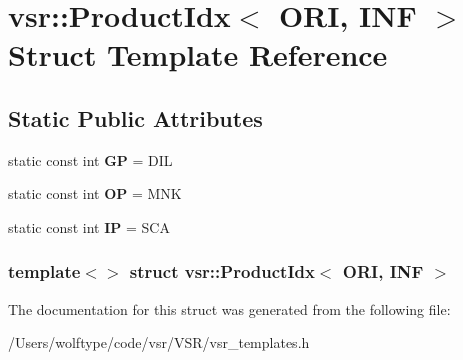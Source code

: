 \hypertarget{structvsr_1_1_product_idx_3_01_o_r_i_00_01_i_n_f_01_4}{\section{vsr\-:\-:Product\-Idx$<$ O\-R\-I, I\-N\-F $>$ Struct Template Reference}
\label{structvsr_1_1_product_idx_3_01_o_r_i_00_01_i_n_f_01_4}
}
\subsection*{Static Public Attributes}
\begin{DoxyCompactItemize}
\item 
\hypertarget{structvsr_1_1_product_idx_3_01_o_r_i_00_01_i_n_f_01_4_aac8eb9a04ba008186aa618f35bb2d6ff}{static const int {\bfseries G\-P} = D\-I\-L}\label{structvsr_1_1_product_idx_3_01_o_r_i_00_01_i_n_f_01_4_aac8eb9a04ba008186aa618f35bb2d6ff}

\item 
\hypertarget{structvsr_1_1_product_idx_3_01_o_r_i_00_01_i_n_f_01_4_afac3177cfec6a51fd3630ef88ad11fd2}{static const int {\bfseries O\-P} = M\-N\-K}\label{structvsr_1_1_product_idx_3_01_o_r_i_00_01_i_n_f_01_4_afac3177cfec6a51fd3630ef88ad11fd2}

\item 
\hypertarget{structvsr_1_1_product_idx_3_01_o_r_i_00_01_i_n_f_01_4_ab24f1ccfd74bace5d0b6314b7e8ad7e9}{static const int {\bfseries I\-P} = S\-C\-A}\label{structvsr_1_1_product_idx_3_01_o_r_i_00_01_i_n_f_01_4_ab24f1ccfd74bace5d0b6314b7e8ad7e9}

\end{DoxyCompactItemize}
\subsubsection*{template$<$$>$ struct vsr\-::\-Product\-Idx$<$ O\-R\-I, I\-N\-F $>$}



The documentation for this struct was generated from the following file\-:\begin{DoxyCompactItemize}
\item 
/\-Users/wolftype/code/vsr/\-V\-S\-R/vsr\-\_\-templates.\-h\end{DoxyCompactItemize}
